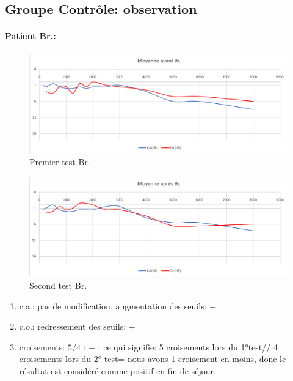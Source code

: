  \subsection*{Groupe Contrôle: observation}
  \paragraph{ Patient Br.:}
  \begin{figure}[ht]
\centering
\includegraphics[width=1\linewidth]{images/graphiques/bru_pre.png}
\caption[  \textbf{Groupe Contrôle}: Patient Br.. 1° test]{Premier test Br.}
\end{figure}



 \begin{figure}[th]
\centering
\includegraphics[width=1\linewidth]{images/graphiques/bru_post.png}
\caption[Patient Br. :  2° test]{Second test Br.}

\end{figure}

	\begin{enumerate}
 		\item  c.a.: pas de modification, augmentation des
                  seuils: $-$
 		\item  c.o.: redressement des seuils: $+$
 		\item  croisements: $5/4$ : $+$ : ce qui signifie:  5 croisements lors du 1°test// 4 croisements lors du 2° test= nous avons 1 croisement en moins, donc le résultat est considéré comme positif en fin
                  de séjour.
                \end{enumerate}

